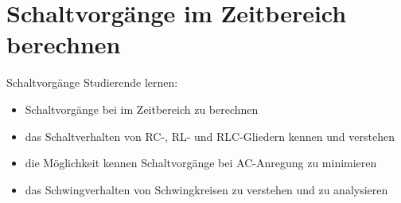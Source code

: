 
\section[Berechnung im Zeitbereich]{Schaltvorgänge im Zeitbereich berechnen}
\label{sec:schaltvorgaengezeitbereich}
\begin{frame}\ftx{\secname}
%
    \begin{Lernziele}{Schaltvorgänge}
        Studierende lernen:
        \begin{itemize}
            \item Schaltvorgänge bei im Zeitbereich zu berechnen %
            \item das Schaltverhalten von RC-, RL- und RLC-Gliedern kennen und verstehen %
            \item die Möglichkeit kennen Schaltvorgänge bei AC-Anregung zu minimieren%
            \item das Schwingverhalten von Schwingkreisen zu verstehen und zu analysieren %
        \end{itemize}
    \end{Lernziele}
\end{frame}


